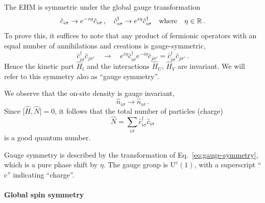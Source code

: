 The EHM is symmetric under the global gauge transformation
\begin{equation}\label{eq:gauge-symmetry}
	\hat c_{i\sigma} \to e^{-i\eta} \hat c_{i\sigma} \, ,
	\quad
	\hat c_{i\sigma}^\dagger \to e^{i\eta} \hat c_{i\sigma}^\dagger
	\qq{where}
	\eta \in \mathbb{R} \, .
\end{equation}
To prove this, it suffices to note that any product of fermionic operators with an equal number of annihilations and creations is gauge-symmetric,
\begin{equation}\label{eq:gauge-symmetry-c+c-}
	\hat c_{i\sigma}^\dagger \hat c_{j\sigma'}
	\quad\to\quad
	e^{i\eta} \hat c_{i\sigma}^\dagger e^{-i\eta} \hat c_{j\sigma'} = \hat c_{i\sigma}^\dagger \hat c_{j\sigma'} \, .
\end{equation}
Hence the kinetic part $\hat H_t$ and the interactions $\hat H_U$, $\hat H_V$ are invariant. We will refer to this symmetry also as ``gauge symmetry''.

We observe that the on-site density is gauge invariant,
\begin{equation}\label{eq:ehm-n-gauge}
	\hat n_{i\sigma} \to \hat n_{i\sigma} \, .
\end{equation}
Since $\big[ \hat H,\hat N \big] = 0$, it follows that the total number of particles (charge)
\[
	\hat{N} = \sum_{i\sigma} \hat c_{i\sigma}^\dagger \hat c_{i\sigma}
\]
is a good quantum number. 

Gauge symmetry is described by the transformation of Eq.~\eqref{eq:gauge-symmetry}, which is a pure phase shift by $\eta$. The gauge group is $\mathrm{U}^\mathrm{c}(1)$, with a superscript ``$\mathrm{c}$'' indicating ``charge''.

\paragraph{Global spin symmetry}

